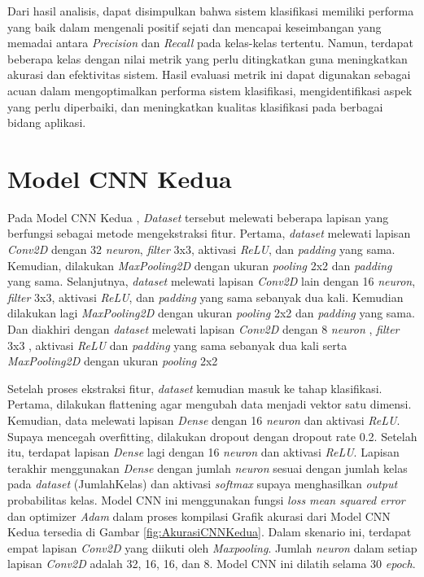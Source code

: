 Dari hasil analisis, dapat disimpulkan bahwa sistem klasifikasi memiliki performa yang baik dalam mengenali positif sejati dan mencapai keseimbangan yang memadai antara \textit{Precision} dan \textit{Recall} pada kelas-kelas tertentu. Namun, terdapat beberapa kelas dengan nilai metrik yang perlu ditingkatkan guna meningkatkan akurasi dan efektivitas sistem. Hasil evaluasi metrik ini dapat digunakan sebagai acuan dalam mengoptimalkan performa sistem klasifikasi, mengidentifikasi aspek yang perlu diperbaiki, dan meningkatkan kualitas klasifikasi pada berbagai bidang aplikasi.

\section{Model CNN Kedua}
Pada Model CNN Kedua , \textit{Dataset} tersebut melewati beberapa lapisan yang berfungsi sebagai metode mengekstraksi fitur. Pertama, \textit{dataset} melewati lapisan \textit{Conv2D} dengan 32 \textit{neuron}, \textit{filter} 3x3, aktivasi \textit{ReLU}, dan \textit{padding} yang sama. Kemudian, dilakukan \textit{MaxPooling2D} dengan ukuran \textit{pooling} 2x2 dan \textit{padding} yang sama. Selanjutnya, \textit{dataset} melewati lapisan \textit{Conv2D} lain dengan 16 \textit{neuron}, \textit{filter} 3x3, aktivasi \textit{ReLU}, dan \textit{padding} yang sama sebanyak dua kali. Kemudian dilakukan lagi \textit{MaxPooling2D} dengan ukuran \textit{pooling} 2x2 dan \textit{padding} yang sama. Dan diakhiri dengan \textit{dataset} melewati lapisan \textit{Conv2D} dengan 8 \textit{neuron} , \textit{filter} 3x3 , aktivasi \textit{ReLU} dan \textit{padding} yang sama sebanyak dua kali serta \textit{MaxPooling2D} dengan ukuran \textit{pooling} 2x2 

Setelah proses ekstraksi fitur, \textit{dataset} kemudian masuk ke tahap klasifikasi. Pertama, dilakukan flattening agar mengubah data menjadi vektor satu dimensi. Kemudian, data melewati lapisan \textit{Dense} dengan 16 \textit{neuron} dan aktivasi \textit{ReLU}. Supaya mencegah overfitting, dilakukan dropout dengan dropout rate 0.2. Setelah itu, terdapat lapisan \textit{Dense} lagi dengan 16 \textit{neuron} dan aktivasi \textit{ReLU}. Lapisan terakhir menggunakan \textit{Dense} dengan jumlah \textit{neuron} sesuai dengan jumlah kelas pada \textit{dataset} (JumlahKelas) dan aktivasi \textit{softmax} supaya menghasilkan \textit{output} probabilitas kelas. Model CNN ini menggunakan fungsi \textit{loss} \textit{mean squared error} dan optimizer \textit{Adam} dalam proses kompilasi Grafik akurasi dari Model CNN Kedua tersedia di Gambar \ref{fig:AkurasiCNNKedua}. Dalam skenario ini, terdapat empat lapisan \textit{Conv2D} yang diikuti oleh \textit{Maxpooling}. Jumlah \textit{neuron} dalam setiap lapisan \textit{Conv2D} adalah 32, 16, 16, dan 8. Model CNN ini dilatih selama 30\textit{ epoch}.

